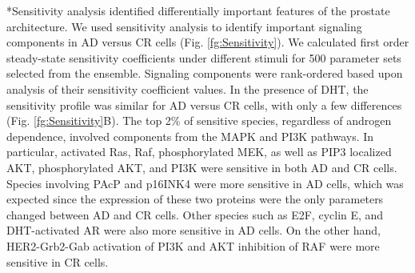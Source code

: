 \documentclass[12pt]{article}
\makeatletter
\renewcommand\subsection{\@startsection
	{subsection}{2}{0mm}
	{-0.05in}
	{-0.5\baselineskip}
	{\normalfont\normalsize\bfseries}}
\makeatother
\begin{document}
\subsection*{Sensitivity analysis identified differentially important features of the prostate architecture.} 
We used sensitivity analysis to identify important signaling components in AD versus CR cells (Fig. \ref{fg:Sensitivity}). 
We calculated first order steady-state sensitivity coefficients under different stimuli for 500 parameter sets selected from the ensemble. 
Signaling components were rank-ordered based upon analysis of their sensitivity coefficient values. 
In the presence of DHT, the sensitivity profile was similar for AD versus CR cells, with only a few differences (Fig. \ref{fg:Sensitivity}B). 
The top 2\% of sensitive species, regardless of androgen dependence, involved components from the MAPK and PI3K pathways. 
In particular, activated Ras, Raf, phosphorylated MEK, as well as PIP3 localized AKT, phosphorylated AKT, and PI3K were sensitive in both AD and CR cells. 
Species involving PAcP and p16INK4 were more sensitive in AD cells, which was expected since the expression of these two proteins were the only parameters changed between AD and CR cells. 
Other species such as E2F, cyclin E, and DHT-activated AR were also more sensitive in AD cells. 
On the other hand, HER2-Grb2-Gab activation of PI3K and AKT inhibition of RAF were more sensitive in CR cells.
\end{document}
